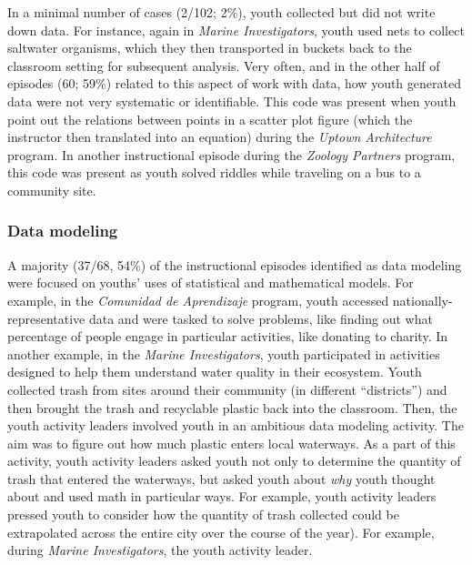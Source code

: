 \documentclass[]{msu-thesis}
\theoremstyle{definition}
\theoremstyle{definition}
\theoremstyle{definition}
\theoremstyle{remark}
\begin{document}
In a minimal number of cases (2/102; 2\%), youth collected but did not
write down data. For instance, again in \emph{Marine Investigators},
youth used nets to collect saltwater organisms, which they then
transported in buckets back to the classroom setting for subsequent
analysis. Very often, and in the other half of episodes (60; 59\%)
related to this aspect of work with data, how youth generated data were
not very systematic or identifiable. This code was present when youth
point out the relations between points in a scatter plot figure (which
the instructor then translated into an equation) during the \emph{Uptown
Architecture} program. In another instructional episode during the
\emph{Zoology Partners} program, this code was present as youth solved
riddles while traveling on a bus to a community site.

\subsubsection{Data modeling}\label{data-modeling}

A majority (37/68, 54\%) of the instructional episodes identified as
data modeling were focused on youths' uses of statistical and
mathematical models. For example, in the \emph{Comunidad de Aprendizaje}
program, youth accessed nationally-representative data and were tasked
to solve problems, like finding out what percentage of people engage in
particular activities, like donating to charity. In another example, in
the \emph{Marine Investigators}, youth participated in activities
designed to help them understand water quality in their ecosystem. Youth
collected trash from sites around their community (in different
``districts'') and then brought the trash and recyclable plastic back
into the classroom. Then, the youth activity leaders involved youth in
an ambitious data modeling activity. The aim was to figure out how much
plastic enters local waterways. As a part of this activity, youth
activity leaders asked youth not only to determine the quantity of trash
that entered the waterways, but asked youth about \emph{why} youth
thought about and used math in particular ways. For example, youth
activity leaders pressed youth to consider how the quantity of trash
collected could be extrapolated across the entire city over the course
of the year). For example, during \emph{Marine Investigators}, the youth
activity leader.
\end{document}
